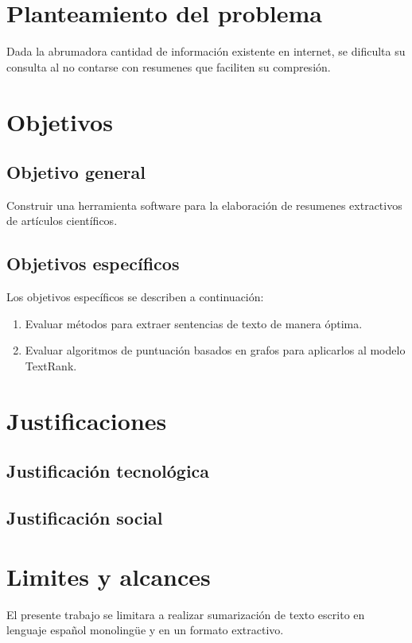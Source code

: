 
\section{Planteamiento del problema}
Dada la abrumadora cantidad de informaci\'on existente en internet, se dificulta su
consulta al no contarse con resumenes que faciliten su compresi\'on.

\section{Objetivos}

\subsection{Objetivo general}
Construir una herramienta software para la elaboraci\'on de resumenes extractivos 
de art\'iculos cient\'ificos.  

\subsection{Objetivos espec\'ificos}
Los objetivos espec\'ificos se describen a continuaci\'on:
\begin{enumerate}
	\item Evaluar m\'etodos para extraer sentencias de texto de manera \'optima.
	\item Evaluar algoritmos de puntuaci\'on basados en grafos para aplicarlos al
	modelo TextRank.
\end{enumerate}

\section{Justificaciones}
\subsection{Justificaci\'on tecnol\'ogica}
\subsection{Justificaci\'on social}



\section{Limites y alcances}
El presente trabajo se limitara a realizar sumarizaci\'on de texto escrito en lenguaje
espa\~nol monoling\"ue y en un formato extractivo.
